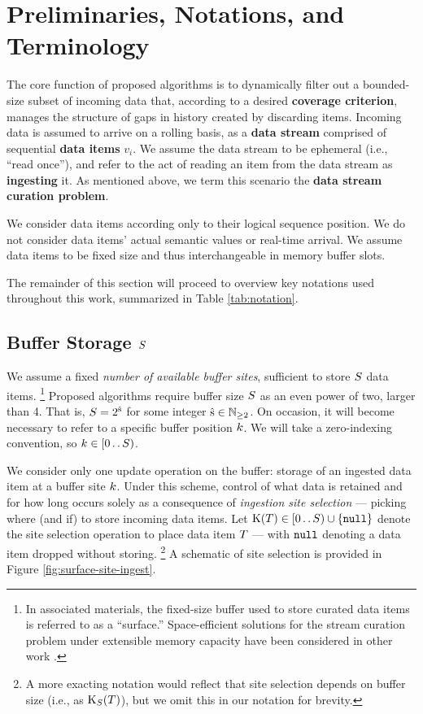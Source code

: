 \section{Preliminaries, Notations, and Terminology} \label{sec:notation}

The core function of proposed algorithms is to dynamically filter out a bounded-size subset of incoming data that, according to a desired \textbf{coverage criterion}, manages the structure of gaps in history created by discarding items.
Incoming data is assumed to arrive on a rolling basis, as a \textbf{data stream} comprised of sequential \textbf{data items} $v_i$.
We assume the data stream to be ephemeral (i.e., ``read once''), and refer to the act of reading an item from the data stream as \textbf{ingesting} it.
As mentioned above, we term this scenario the \textbf{data stream curation problem}.

We consider data items according only to their logical sequence position.
We do not consider data items' actual semantic values or real-time arrival.
We assume data items to be fixed size and thus interchangeable in memory buffer slots.

The remainder of this section will proceed to overview key notations used throughout this work, summarized in Table \ref{tab:notation}.



\subsection{Buffer Storage $\colorS$}
\label{sec:notation-buffer}

We assume a fixed \textit{number of available buffer sites}, sufficient to store $\colorS$ data items.%
\footnote{%
In associated materials, the fixed-size buffer used to store curated data items is referred to as a ``surface.''
Space-efficient solutions for the stream curation problem under extensible memory capacity have been considered in other work \citep{moreno2024algorithms}.%
}
Proposed algorithms require buffer size $\colorS$ as an even power of two, larger than 4. That is, $\colorS = 2^{\colors}$ for some integer $\colors \in \mathbb{N}_{\geq 2}$.
On occasion, it will become necessary to refer to a specific buffer position $\colork$.
We will take a zero-indexing convention, so $\colork \in [0\twodots\colorS)$.

We consider only one update operation on the buffer: storage of an ingested data item at a buffer site $\colork$.
Under this scheme, control of what data is retained and for how long occurs solely as a consequence of \textit{ingestion site selection} --- picking where (and if) to store incoming data items.
Let $\colorK(\colorT) \in [0\twodots\colorS)\cup\{\nullval\}$ denote the site selection operation to place data item $\colorT$ --- with $\texttt{null}$ denoting a data item dropped without storing.%
\footnote{%
A more exacting notation would reflect that site selection depends on buffer size (i.e., as $\colorK_{\colorS}(\colorT)$), but we omit this in our notation for brevity.
}
A schematic of site selection is provided in Figure \ref{fig:surface-site-ingest}.

